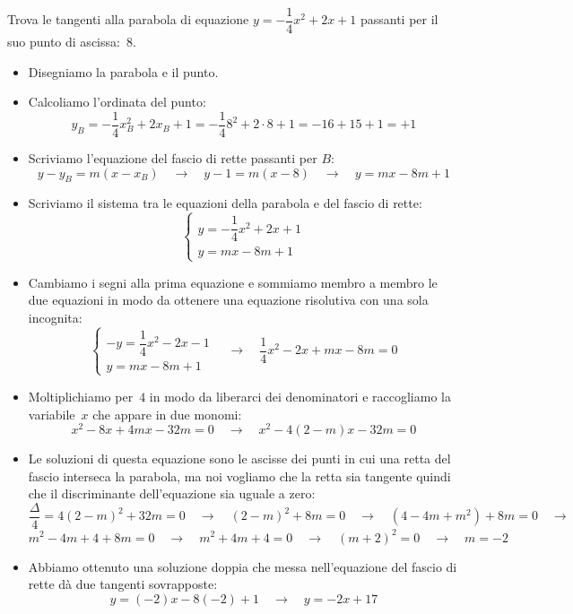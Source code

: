 \begin{esempio}
 Trova le tangenti alla parabola di equazione \(y=-\dfrac{1}{4}x^2+2x +1\) 
 passanti per il suo punto di ascissa:~\(8\).
 
 \begin{itemize}
  \item Disegniamo la parabola e il punto.
  \item Calcoliamo l'ordinata del punto:
\[y_B=-\dfrac{1}{4}x_B^2+2x_B+1=-\dfrac{1}{4}8^2+2 \cdot 8+1= -16+15+1=+1\]
  \item Scriviamo l'equazione del fascio di rette passanti per \(B\):
\[y-y_B = m(x-x_B) \quad \rightarrow \quad 
y-1 = m\left(x-8\right)
\quad \rightarrow \quad y=mx-8m+1\]
  \item Scriviamo il sistema tra le equazioni della parabola e del fascio di 
   rette:
\[\left\{\begin{array}{l}
  y=-\dfrac{1}{4}x^2+2x +1\\
  y=mx-8m+1
\end{array}\right. \]
  \item Cambiamo i segni alla prima equazione e sommiamo membro a membro le
   due equazioni in modo da ottenere una equazione risolutiva con una sola 
   incognita:
\[\left\{\begin{array}{l}
  -y=\dfrac{1}{4}x^2-2x-1\\
  y=mx-8m+1
\end{array}\right. \quad \rightarrow \quad 
\dfrac{1}{4}x^2-2x+mx-8m=0\]
  \item Moltiplichiamo per~\(4\) in modo da liberarci dei denominatori e 
   raccogliamo la variabile~\(x\) che appare in due monomi:
\[x^2-8x+4mx-32m=0 \quad \rightarrow \quad x^2-4(2-m)x-32m=0\]
  \item Le soluzioni di questa equazione sono le ascisse dei punti in cui una 
   retta del fascio interseca la parabola, ma noi vogliamo che la retta sia
   tangente quindi che il discriminante dell'equazione sia uguale a zero:
\[\dfrac{\Delta}{4}=4(2-m)^2+32m=0 \quad \rightarrow \quad 
(2-m)^2+8m=0 \quad \rightarrow \quad
(4-4m+m^2)+8m=0 \quad \rightarrow \quad\]
\[m^2-4m+4+8m=0 \quad \rightarrow \quad
m^2+4m+4=0 \quad \rightarrow \quad
(m+2)^2=0  \quad \rightarrow \quad m=-2\]
  \item Abbiamo ottenuto una soluzione doppia che messa nell'equazione del 
   fascio di rette dà due tangenti sovrapposte:
\[y=(-2)x-8(-2)+1 \quad \rightarrow \quad y=-2x+17\]
 \end{itemize}
\end{esempio}

